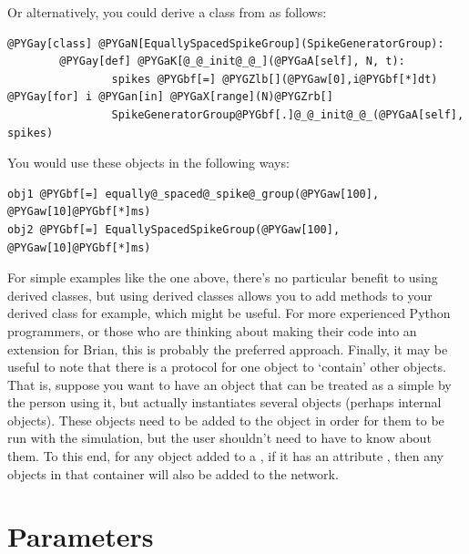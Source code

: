 \documentclass[letterpaper,10pt,english]{manual}
\begin{document}
Or alternatively, you could derive a class from \hyperlink{brian.SpikeGeneratorGroup}{}
as follows:

\begin{Verbatim}[commandchars=@\[\]]
@PYGay[class] @PYGaN[EquallySpacedSpikeGroup](SpikeGeneratorGroup):
        @PYGay[def] @PYGaK[@_@_init@_@_](@PYGaA[self], N, t):
                spikes @PYGbf[=] @PYGZlb[](@PYGaw[0],i@PYGbf[*]dt) @PYGay[for] i @PYGan[in] @PYGaX[range](N)@PYGZrb[]
                SpikeGeneratorGroup@PYGbf[.]@_@_init@_@_(@PYGaA[self], spikes)
\end{Verbatim}

You would use these objects in the following ways:

\begin{Verbatim}[commandchars=@\[\]]
obj1 @PYGbf[=] equally@_spaced@_spike@_group(@PYGaw[100], @PYGaw[10]@PYGbf[*]ms)
obj2 @PYGbf[=] EquallySpacedSpikeGroup(@PYGaw[100], @PYGaw[10]@PYGbf[*]ms)
\end{Verbatim}

For simple examples like the one above, there's no particular benefit to
using derived classes, but using derived classes allows you to add
methods to your derived class for example, which might be useful. For
more experienced Python programmers, or those who are thinking about
making their code into an extension for Brian, this is probably the
preferred approach.
Finally, it may be useful to note that there is a protocol for one object
to `contain' other objects. That is, suppose you want to have an object
that can be treated as a simple \hyperlink{brian.NeuronGroup}{} by the person using it,
but actually instantiates several objects (perhaps internal \hyperlink{brian.Connection}{}
objects). These objects need to be added to the \hyperlink{brian.Network}{} object
in order for them to be run with the simulation, but the user shouldn't need
to have to know about them. To this end, for any object added to a
\hyperlink{brian.Network}{}, if it has an attribute , then any
objects in that container will also be added to the network.

\resetcurrentobjects
\hypertarget{--doc-parameters}{}

\section{Parameters}
\end{document}
